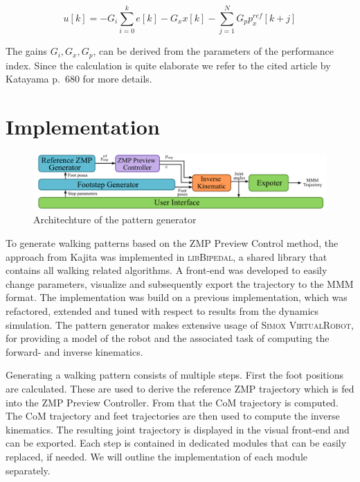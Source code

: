 \documentclass[english,ngerman]{KITreprt}
\newcommand{\name}[1]{\textsc{#1}}
\begin{document}
\begin{equation}
u[k] = -G_i \sum^k_{i=0} e[k] - G_x x[k] - \sum^N_{j=1} G_p p^{ref}_x[k + j]
\end{equation}

The gains $G_i, G_x, G_p$, can be derived from the parameters of the
performance index. Since the calculation is quite elaborate we refer to
the cited article by Katayama p.~680 for more details.

\section{Implementation}\label{implementation}

\begin{figure}[tb]
\vspace*{-1em}
\includegraphics[width=\textwidth]{images/pattern_generator_architechture.png}
\caption{Architechture of the pattern generator}
\label{img:pattern-generator-architechture}
\end{figure}

To generate walking patterns based on the ZMP Preview Control method,
the approach from Kajita was implemented in \name{libBipedal}, a shared
library that contains all walking related algorithms. A front-end was
developed to easily change parameters, visualize and subsequently export
the trajectory to the \name{MMM} format. The implementation was build on
a previous implementation, which was refactored, extended and tuned with
respect to results from the dynamics simulation. The pattern generator
makes extensive usage of \name{Simox VirtualRobot}, for providing a
model of the robot and the associated task of computing the forward- and
inverse kinematics.

Generating a walking pattern consists of multiple steps. First the foot
positions are calculated. These are used to derive the reference ZMP
trajectory which is fed into the ZMP Preview Controller. From that the
CoM trajectory is computed. The CoM trajectory and feet trajectories are
then used to compute the inverse kinematics. The resulting joint
trajectory is displayed in the visual front-end and can be exported.
Each step is contained in dedicated modules that can be easily replaced,
if needed. We will outline the implementation of each module separately.
\end{document}
